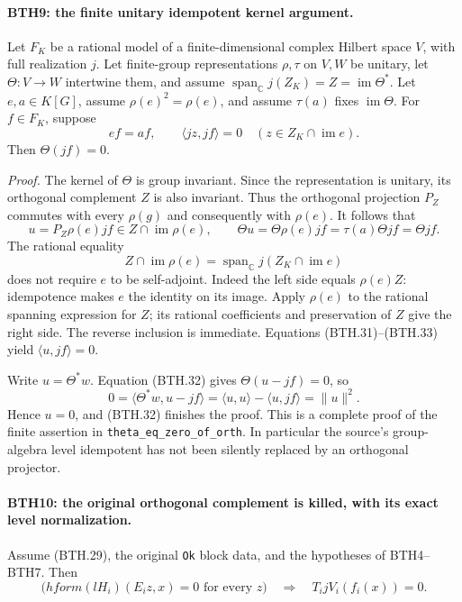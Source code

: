 \paragraph{BTH9: the finite unitary idempotent kernel argument.}
\label{claim:BTH9}
Let \(F_K\) be a rational model of a finite-dimensional
complex Hilbert space \(V\), with full realization \(j\).
Let finite-group representations \(\rho,\tau\) on \(V,W\)
be unitary, let \(\Theta:V\to W\) intertwine them, and
assume
\(\operatorname{span}_{\mathbb C}j(Z_K)
  =Z=\operatorname{im}\Theta^*\).
Let \(e,a\in K[G]\), assume \(\rho(e)^2=\rho(e)\), and
assume \(\tau(a)\) fixes \(\operatorname{im}\Theta\).
For \(f\in F_K\), suppose
\[
 ef=af,\qquad
       \langle jz,jf\rangle=0
           \quad(z\in Z_K\cap\operatorname{im}e).
 \tag{BTH.31}
\]
Then \(\Theta(jf)=0\).

\emph{Proof.}
The kernel of \(\Theta\) is group invariant.  Since
the representation is unitary, its orthogonal complement
\(Z\) is also invariant.  Thus the orthogonal projection
\(P_Z\) commutes with every \(\rho(g)\) and consequently
with \(\rho(e)\).  It follows that
\[
 u=P_Z\rho(e)jf\in Z\cap\operatorname{im}\rho(e),
 \qquad
 \Theta u=\Theta\rho(e)jf=\tau(a)\Theta jf=\Theta jf.
 \tag{BTH.32}
\]
The rational equality
\[
 Z\cap\operatorname{im}\rho(e)
       =\operatorname{span}_{\mathbb C}
                     j(Z_K\cap\operatorname{im}e)               \tag{BTH.33}
\]
does not require \(e\) to be self-adjoint.  Indeed the
left side equals \(\rho(e)Z\): idempotence makes \(e\)
the identity on its image.  Apply \(\rho(e)\) to the
rational spanning expression for \(Z\); its rational
coefficients and preservation of \(Z\) give the right
side.  The reverse inclusion is immediate.
Equations (BTH.31)--(BTH.33) yield
\(\langle u,jf\rangle=0\).

Write \(u=\Theta^*w\).  Equation (BTH.32) gives
\(\Theta(u-jf)=0\), so
\[
 0=\langle\Theta^*w,u-jf\rangle
   =\langle u,u\rangle-\langle u,jf\rangle
   =\|u\|^2.                                                    \tag{BTH.34}
\]
Hence \(u=0\), and (BTH.32) finishes the proof.
This is a complete proof of the finite assertion in
\texttt{theta\_\allowbreak eq\_\allowbreak zero\_\allowbreak of\_\allowbreak orth}.  In particular the
source's group-algebra level idempotent has not been
silently replaced by an orthogonal projector.

\paragraph{BTH10: the original orthogonal complement is killed, with its exact level normalization.}
\label{claim:BTH10}
Assume (BTH.29), the original \texttt{Ok} block data, and
the hypotheses of BTH4--BTH7.  Then
\[
  \bigl(hform(lH_i)(E_i z,x)=0\text{ for every }z\bigr)
       \quad\Longrightarrow\quad T_i jV_i(f_i(x))=0.
 \tag{BTH.35}
\]

